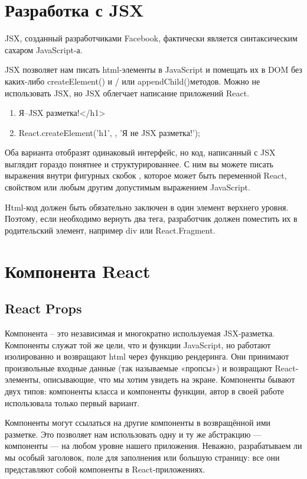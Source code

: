 \documentclass[12pt, a4paper]{diplom}
\begin{document}
\section{Разработка с JSX}

JSX\cite{JSX}, созданный разработчиками Facebook, фактически является синтаксическим сахаром JavaScript-а.

JSX позволяет нам писать html-элементы в JavaScript и помещать их в DOM без каких-либо createElement() и / или appendChild()методов. Можно не использовать JSX, но JSX облегчает написание приложений React.
\begin{enumerate}
\item<h1>Я--JSX разметка!</h1>
\item React.createElement('h1', {}, 'Я не JSX разметка!');
\end{enumerate}

Оба варианта отобразят одинаковый интерфейс, но код, написанный с JSX выглядит гораздо понятнее и структурированнее. С ним вы можете писать выражения внутри фигурных скобок {}, которое
может быть переменной React, свойством или любым другим допустимым выражением JavaScript.

Html-код должен быть обязательно заключен в один элемент верхнего уровня.
Поэтому, если необходимо вернуть два тега, разработчик должен поместить их в родительский элемент, например div или React.Fragment.
\section{Компонента React}

\subsection{React Props}

Компонента -- это независимая и многократно используемая JSX-разметка. Компоненты служат той же цели, что и функции JavaScript, но работают изолированно и возвращают html через функцию рендеринга. Они принимают произвольные входные данные (так называемые «пропсы») и возвращают React-элементы, описывающие, что мы хотим увидеть на экране.
Компоненты бывают двух типов: компоненты класса и компоненты функции, автор в своей работе использовала только первый вариант.

Компоненты могут ссылаться на другие компоненты в возвращённой ими разметке. Это позволяет нам использовать одну и ту же абстракцию — компоненты — на любом уровне нашего приложения. Неважно, разрабатываем ли мы особый заголовок, поле для заполнения или большую страницу: все они представляют собой компоненты в React-приложениях.
\end{document}
